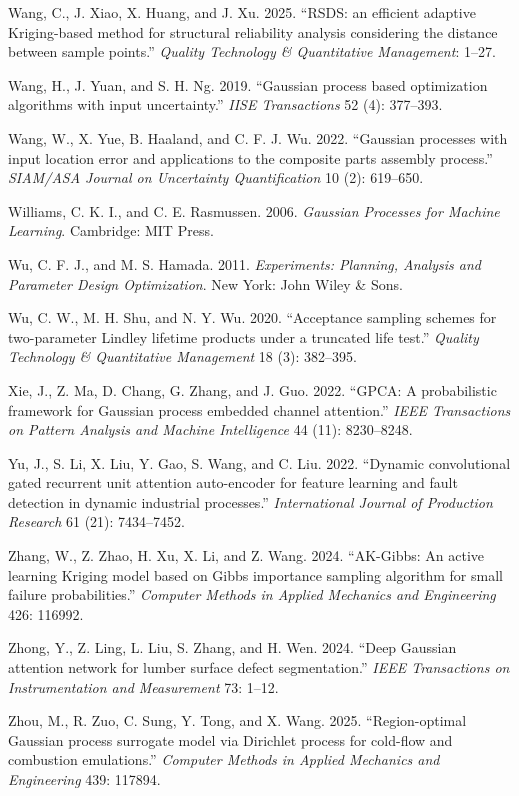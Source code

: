 \documentclass[]{interact}
\theoremstyle{plain}%
\theoremstyle{definition}
\theoremstyle{remark}
\begin{document}
\begin{thebibliography}{}
Wang, C., J. Xiao, X. Huang, and J. Xu. 2025. ``RSDS: an efficient adaptive Kriging-based method for structural reliability analysis considering the distance between sample points.'' \emph{Quality Technology \& Quantitative Management}: 1--27.

Wang, H., J. Yuan, and S. H. Ng. 2019. ``Gaussian process based optimization algorithms with input uncertainty.'' \emph{IISE Transactions} 52 (4): 377--393.

Wang, W., X. Yue, B. Haaland, and C. F. J. Wu. 2022. ``Gaussian processes with input location error and applications to the composite parts assembly process.'' \emph{SIAM/ASA Journal on Uncertainty Quantification} 10 (2): 619--650.

Williams, C. K. I., and C. E. Rasmussen. 2006. \emph{Gaussian Processes for Machine Learning}. Cambridge: MIT Press.

Wu, C. F. J., and M. S. Hamada. 2011. \emph{Experiments: Planning, Analysis and Parameter Design Optimization}. New York: John Wiley \& Sons.

Wu, C. W., M. H. Shu, and N. Y. Wu. 2020. ``Acceptance sampling schemes for two-parameter Lindley lifetime products under a truncated life test.'' \emph{Quality Technology \& Quantitative Management} 18 (3): 382--395.

Xie, J., Z. Ma, D. Chang, G. Zhang, and J. Guo. 2022. ``GPCA: A probabilistic framework for Gaussian process embedded channel attention.'' \emph{IEEE Transactions on Pattern Analysis and Machine Intelligence} 44 (11): 8230--8248.

Yu, J., S. Li, X. Liu, Y. Gao, S. Wang, and C. Liu. 2022. ``Dynamic convolutional gated recurrent unit attention auto-encoder for feature learning and fault detection in dynamic industrial processes.'' \emph{International Journal of Production Research} 61 (21): 7434--7452.

Zhang, W., Z. Zhao, H. Xu, X. Li, and Z. Wang. 2024. ``AK-Gibbs: An active learning Kriging model based on Gibbs importance sampling algorithm for small failure probabilities.'' \emph{Computer Methods in Applied Mechanics and Engineering} 426: 116992.

Zhong, Y., Z. Ling, L. Liu, S. Zhang, and H. Wen. 2024. ``Deep Gaussian attention network for lumber surface defect segmentation.'' \emph{IEEE Transactions on Instrumentation and Measurement} 73: 1--12.

Zhou, M., R. Zuo, C. Sung, Y. Tong, and X. Wang. 2025. ``Region-optimal Gaussian process surrogate model via Dirichlet process for cold-flow and combustion emulations.'' \emph{Computer Methods in Applied Mechanics and Engineering} 439: 117894.

\end{thebibliography}
\end{document}

